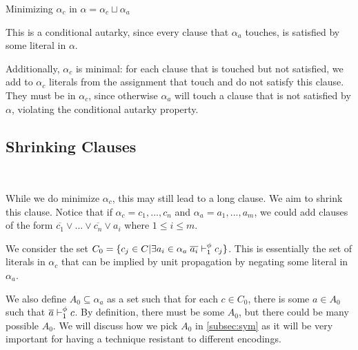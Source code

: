 \begin{algorithm}
    \caption{Minimizing $\alpha_c$ in $\alpha = \alpha_c \sqcup \alpha_a$}\label{alg:leastcond}
    \SetAlgoNoLine

\end{algorithm}

This is a conditional autarky, since every clause that $\alpha_a$ touches, is satisfied by some literal in $\alpha$.

Additionally, $\alpha_c$ is minimal: for each clause that is touched but not satisfied, we add to $\alpha_c$ literals from the assignment that touch and do not satisfy this clause. They must be in $\alpha_c$, since otherwise $\alpha_a$ will touch a clause that is not satisfied by $\alpha$, violating the conditional autarky property.

\subsection{Shrinking Clauses}~\label{subsec:shrinking}

While we do minimize $\alpha_c$, this may still lead to a long clause. We aim to shrink this clause. Notice that if $\alpha_c = c_1, ..., c_n$ and $\alpha_a = a_1, ..., a_m$, we could add clauses of the form $\overline{c_1} \lor ... \lor \overline{c_n} \lor a_i$ where $1 \leq i \leq m$.


We consider the set $C_0 = \{c_j \in C| \exists a_i \in \alpha_a \; \overline{a_i} \vdash_1^\phi c_j \}$. This is essentially the set of literals in $\alpha_c$ that can be implied by unit propagation by negating some literal in $\alpha_a$.

We also define $A_0 \subseteq \alpha_a$ as a set such that for each $c \in C_0$, there is some $a \in A_0$ such that $\overline{a} \vdash_1^\phi c$. By definition, there must be some $A_0$, but there could be many possible $A_0$. We will discuss how we pick $A_0$ in \autoref{subsec:sym} as it will be very important for having a technique resistant to different encodings. 


